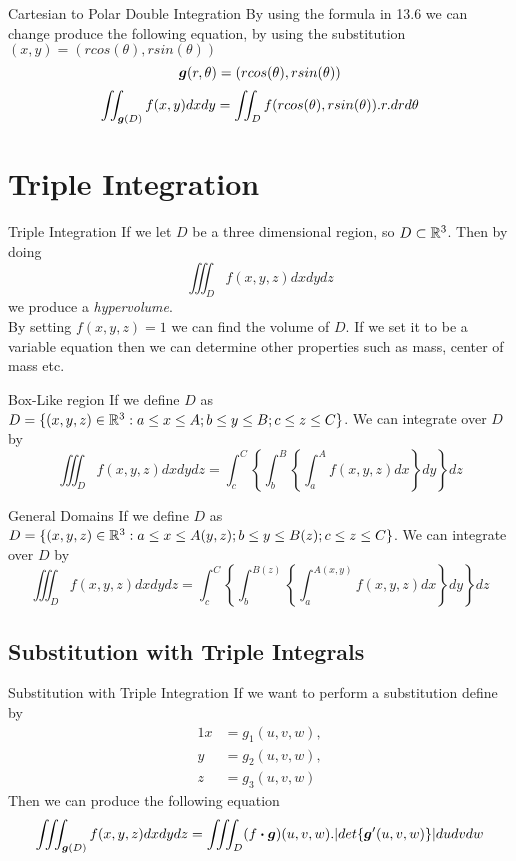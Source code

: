 \documentclass[11pt,a4paper]{article}
\begin{document}
\subtitle{Remark 13.7 - }{Cartesian to Polar Double Integration}
By using the formula in 13.6 we can change produce the following equation, by using the substitution $(x, y) = (rcos(\theta), rsin(\theta))$
$$\boldsymbol{g}(r, \theta) = (rcos(\theta), rsin(\theta))$$
$$\iint_{\boldsymbol{g}(D)} f(x, y) dx dy = \iint_D f(rcos(\theta), rsin(\theta)). r . dr d\theta$$

\section{Triple Integration}

\subtitle{Remark 14.1 - }{Triple Integration}
If we let $D$ be a three dimensional region, so $D \subset \mathbb{R}^3$. Then by doing
$$\iiint_{D}f(x, y, z)dxdydz$$
we produce a \textit{hypervolume}.\\
By setting $f(x, y, z) = 1$ we can find the volume of $D$. If we set it to be a variable equation then we can determine other properties such as mass, center of mass etc.\\

\subtitle{Theorem 14.2 - }{Box-Like region}
If we define $D$ as $D = \{(x, y , z) \in \mathbb{R}^3 : a \leq x \leq A; b \leq y \leq B; c \leq z \leq C \}$. We can integrate over $D$ by
$$\iiint_{D}f(x, y , z)dxdydz = \int_{c}^{C} \left\{ \int_{b}^{B} \left\{ \int_{a}^{A} f(x, y, z) dx \right\} dy \right\} dz$$

\subtitle{Theorem 14.3 - }{General Domains}
If we define $D$ as $D = \{ (x, y , z) \in \mathbb{R}^3: a \leq x \leq A(y, z); b \leq y \leq B(z); c \leq z \leq C \}$. We can integrate over $D$ by
$$\iiint_{D}f(x, y , z)dxdydz = \int_{c}^{C} \left\{ \int_{b}^{B(z)} \left\{ \int_{a}^{A(x, y)} f(x, y, z) dx \right\} dy \right\} dz$$

\subsection{Substitution with Triple Integrals}

\subtitle{Theorem 14.4 - }{Substitution with Triple Integration}
If we want to perform a substitution define by
\begin{alignat*}{1}
  x &= g_1(u, v, w), \\
  y &= g_2(u, v, w), \\
  z &= g_3(u, v, w)
\end{alignat*}
Then we can produce the following equation
$$\iiint_{\boldsymbol{g}(D)} f(x, y, z) dx dy dz = \iiint_{D} (f \boldsymbol{\cdot} \boldsymbol{g})(u, v, w).|det \{\boldsymbol{g}'(u, v, w)\}| du dv dw$$
\end{document}
